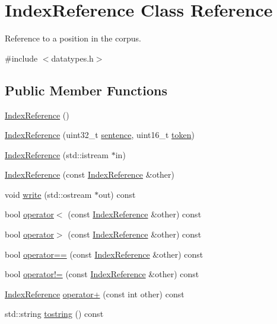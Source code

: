 \hypertarget{classIndexReference}{}\section{Index\+Reference Class Reference}
\label{classIndexReference}


Reference to a position in the corpus.  




{\ttfamily \#include $<$datatypes.\+h$>$}

\subsection*{Public Member Functions}
\begin{DoxyCompactItemize}
\item 
\hyperlink{classIndexReference_afcc00f656c2940e65cf7771efb663eb2}{Index\+Reference} ()
\item 
\hyperlink{classIndexReference_a6a5540b71a1e86d0165e5845979eea0b}{Index\+Reference} (uint32\+\_\+t \hyperlink{classIndexReference_ac8e7129f517e6ceb4c223e7568219f47}{sentence}, uint16\+\_\+t \hyperlink{classIndexReference_a90f3de27395e19a1d53f62f9e7bea1d7}{token})
\item 
\hyperlink{classIndexReference_a1bae610567a3133e4c362e46ade5f7d0}{Index\+Reference} (std\+::istream $\ast$in)
\item 
\hyperlink{classIndexReference_a7bb45da23e1718f13d9ee53bae79c175}{Index\+Reference} (const \hyperlink{classIndexReference}{Index\+Reference} \&other)
\item 
void \hyperlink{classIndexReference_a5e1726b6ce5fed19478fad34315c1eca}{write} (std\+::ostream $\ast$out) const 
\item 
bool \hyperlink{classIndexReference_aa36bf5625589f6da824732da2391b040}{operator$<$} (const \hyperlink{classIndexReference}{Index\+Reference} \&other) const 
\item 
bool \hyperlink{classIndexReference_a03c5501f91f5e9c478902067f90f4632}{operator$>$} (const \hyperlink{classIndexReference}{Index\+Reference} \&other) const 
\item 
bool \hyperlink{classIndexReference_a6481b0eb9b078a7d5961358a721ae685}{operator==} (const \hyperlink{classIndexReference}{Index\+Reference} \&other) const 
\item 
bool \hyperlink{classIndexReference_ad4c7fee2cbadf635c1f87aa6c0aeaae5}{operator!=} (const \hyperlink{classIndexReference}{Index\+Reference} \&other) const 
\item 
\hyperlink{classIndexReference}{Index\+Reference} \hyperlink{classIndexReference_a2be54b0378ac272539dde33b8920d830}{operator+} (const int other) const 
\item 
std\+::string \hyperlink{classIndexReference_ae59b115f9e1b41a26352d9e9e0d76dfb}{tostring} () const 
\end{DoxyCompactItemize}
